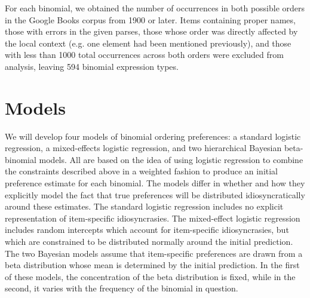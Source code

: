 \documentclass[10pt,letterpaper]{article}
\begin{document}


For each binomial, we obtained the number of occurrences in both possible orders in the Google Books corpus from 1900 or later. Items containing proper names, those with errors in the given parses, those whose order was directly affected by the local context (e.g. one element had been mentioned previously), and those with less than 1000 total occurrences across both orders were excluded from analysis, leaving 594 binomial expression types.

\section{Models}
We will develop four models of binomial ordering preferences: a standard logistic regression, a mixed-effects logistic regression, and two hierarchical Bayesian beta-binomial models. All are based on the idea of using logistic regression to combine the constraints described above in a weighted fashion to produce an initial preference estimate for each binomial. The models differ in whether and how they explicitly model the fact that true preferences will be distributed idiosyncratically around these estimates. The standard logistic regression includes no explicit representation of item-specific idiosyncrasies. The mixed-effect logistic regression includes random intercepts which account for item-specific idiosyncrasies, but which are constrained to be distributed normally around the initial prediction. The two Bayesian models assume that item-specific preferences are drawn from a beta distribution whose mean is determined by the initial prediction. In the first of these models, the concentration of the beta distribution is fixed, while in the second, it varies with the frequency of the binomial in question. 
\end{document}
